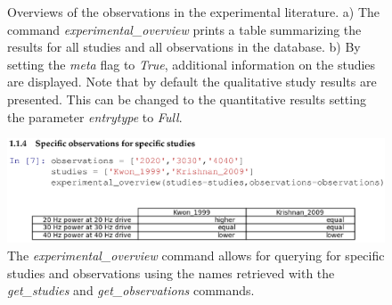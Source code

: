 \documentclass[a4paper,10pt]{article}
\begin{document}
\begin{figure}
\caption{Overviews of the observations in the experimental literature. a) The command \textit{experimental\_overview} prints a table summarizing the results for all studies and all observations in the database.
b) By setting the \textit{meta} flag to \textit{True}, additional information on the studies are displayed. Note that by default the qualitative study results are presented. This can be changed to the quantitative results
setting the parameter \textit{entrytype} to \textit{Full}. }
\label{Fig:ExpOverview1}
\end{figure}

\begin{figure}
\includegraphics[width=\textwidth]{Figures/specific_studies_and_observations}
\caption{The \textit{experimental\_overview} command allows for querying for specific studies and observations using the names retrieved with the \textit{get\_studies} and \textit{get\_observations} commands.}
\label{Fig:ExpOverview2}
\end{figure}
\end{document}

